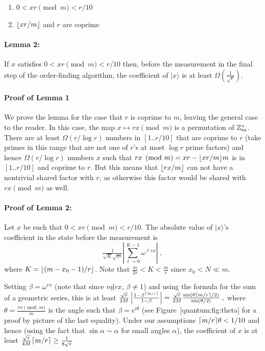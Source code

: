 \begin{enumerate}
\def\labelenumi{\arabic{enumi}.}
\item
  \(0 < xr \pmod{m} < r/10\)
\item
  \(\lfloor xr/m \rfloor\) and \(r\) are coprime
\end{enumerate}

\paragraph{Lemma 2:} If \(x\) satisfies \(0 < xr \pmod{m} < r/10\) then,
before the measurement in the final step of the order-finding algorithm,
the coefficient of \(|x\rangle\) is at least
\(\Omega(\tfrac{1}{\sqrt{r}})\).

\paragraph{Proof of Lemma 1} We prove the lemma for the case that \(r\)
is coprime to \(m\), leaving the general case to the reader. In this
case, the map \(x \mapsto rx \pmod{m}\) is a permutation of \({\mathbb{Z}}^*_m\).
There are at least \(\Omega(r/\log r)\) numbers in \([1..r/10]\) that
are coprime to \(r\) (take primes in this range that are not one of
\(r\)'s at most \(\log r\) prime factors) and hence \(\Omega(r/\log r)\)
numbers \(x\) such that \(rx \pmod{m} = xr - \lfloor xr/m \rfloor m\) is in
\([1..r/10]\) and coprime to \(r\). But this means that \(\lfloor rx/m \rfloor\)
can not have a nontrivial shared factor with \(r\), as otherwise this
factor would be shared with \(rx \pmod{m}\) as well.

\paragraph{Proof of Lemma 2:} Let \(x\) be such that
\(0 < xr \pmod{m} < r/10\). The absolute value of \(|x\rangle\)'s
coefficient in the state before the measurement is
\[\tfrac{1}{\sqrt{K}\sqrt{m}}\left| \sum_{\ell=0}^{K-1} \omega^{\ell r x} \right| \;,\]
where \(K = \lfloor (m-x_0-1)/r \rfloor\). Note that
\(\tfrac{m}{2r} < K < \tfrac{m}{r}\) since \(x_0 < N \ll m\).

Setting \(\beta=\omega^{rx}\) (note that since \(m \not| rx\),
\(\beta \neq 1\)) and using the formula for the sum of a geometric
series, this is at least
\(\tfrac{\sqrt{r}}{2M}\left| \tfrac{1 - \beta^{\lceil m/r \rceil}}{1-\beta} \right| = \tfrac{\sqrt{r}}{2M}\tfrac{\sin(\theta\lceil m/r \rceil/2)}{\sin(\theta/2)} \;,\)
where \(\theta=\tfrac{rx \pmod{m}}{m}\) is the angle such that
\(\beta = e^{i\theta}\) (see Figure~{[}quantum:fig:theta{]} for a proof
by picture of the last equality). Under our assumptions
\(\lceil m/r \rceil\theta<1/10\) and hence (using the fact that
\(\sin \alpha \sim \alpha\) for small angles \(\alpha\)), the
coefficient of \(x\) is at least
\(\tfrac{\sqrt{r}}{4M}\lceil m/r \rceil \geq \tfrac{1}{8\sqrt{r}}\)

